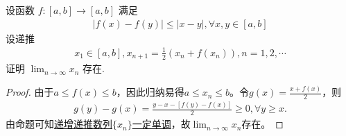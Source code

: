 \documentclass[../../main.tex]{subfiles}
\begin{document}
\begin{example}
设函数 $f:[a,b] \to [a,b]$ 满足
\begin{align*}
|f(x) - f(y)| \leqslant |x - y|, \forall x,y \in [a,b]
\end{align*}
设递推
\begin{align*}
x_1 \in [a,b], x_{n+1} = \frac{1}{2}(x_n + f(x_n)), n = 1,2,\cdots
\end{align*}
证明 $\lim_{n \to \infty} x_n$ 存在.
\end{example}
\begin{proof}
由于$a \leqslant f(x) \leqslant b$，因此归纳易得$a \leqslant x_n \leqslant b$。令$g(x) = \frac{x + f(x)}{2}$，则
\begin{align*}
g(y) - g(x) = \frac{y - x - [f(y) - f(x)]}{2} \geqslant 0, \forall y \geqslant x.
\end{align*}
由命题可知\hyperref[proposition:递增函数递推数列]{递增递推数列$\{ x_n \}$一定单调}，故$\lim_{n \to \infty} x_n$存在。

\end{proof}
\end{document}
